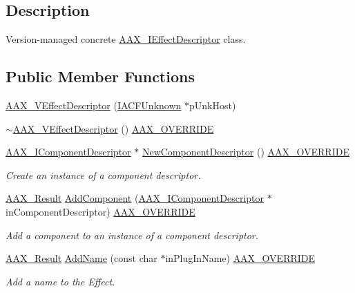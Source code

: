\subsection{Description}
Version-\/managed concrete \mbox{\hyperlink{a01813}{A\+A\+X\+\_\+\+I\+Effect\+Descriptor}} class. \subsection*{Public Member Functions}
\begin{DoxyCompactItemize}
\item 
\mbox{\hyperlink{a01913_a039643848c3e718abccef382c3b9d3c9}{A\+A\+X\+\_\+\+V\+Effect\+Descriptor}} (\mbox{\hyperlink{a01409}{I\+A\+C\+F\+Unknown}} $\ast$p\+Unk\+Host)
\item 
\mbox{\hyperlink{a01913_a7a87dce050a6ee3c6136a6221b90d4b5}{$\sim$\+A\+A\+X\+\_\+\+V\+Effect\+Descriptor}} () \mbox{\hyperlink{a00392_ac2f24a5172689ae684344abdcce55463}{A\+A\+X\+\_\+\+O\+V\+E\+R\+R\+I\+DE}}
\item 
\mbox{\hyperlink{a01781}{A\+A\+X\+\_\+\+I\+Component\+Descriptor}} $\ast$ \mbox{\hyperlink{a01913_a5bfabf31ae3378c465438313c7b22c19}{New\+Component\+Descriptor}} () \mbox{\hyperlink{a00392_ac2f24a5172689ae684344abdcce55463}{A\+A\+X\+\_\+\+O\+V\+E\+R\+R\+I\+DE}}
\begin{DoxyCompactList}\small\item\em Create an instance of a component descriptor. \end{DoxyCompactList}\item 
\mbox{\hyperlink{a00392_a4d8f69a697df7f70c3a8e9b8ee130d2f}{A\+A\+X\+\_\+\+Result}} \mbox{\hyperlink{a01913_ab64b449fc1176f1d4e782b3fa307ad1f}{Add\+Component}} (\mbox{\hyperlink{a01781}{A\+A\+X\+\_\+\+I\+Component\+Descriptor}} $\ast$in\+Component\+Descriptor) \mbox{\hyperlink{a00392_ac2f24a5172689ae684344abdcce55463}{A\+A\+X\+\_\+\+O\+V\+E\+R\+R\+I\+DE}}
\begin{DoxyCompactList}\small\item\em Add a component to an instance of a component descriptor. \end{DoxyCompactList}\item 
\mbox{\hyperlink{a00392_a4d8f69a697df7f70c3a8e9b8ee130d2f}{A\+A\+X\+\_\+\+Result}} \mbox{\hyperlink{a01913_ac52fc7b9a0f8bd5550725c5096aa2926}{Add\+Name}} (const char $\ast$in\+Plug\+In\+Name) \mbox{\hyperlink{a00392_ac2f24a5172689ae684344abdcce55463}{A\+A\+X\+\_\+\+O\+V\+E\+R\+R\+I\+DE}}
\begin{DoxyCompactList}\small\item\em Add a name to the Effect. \end{DoxyCompactList}\item 

\end{DoxyCompactItemize}
